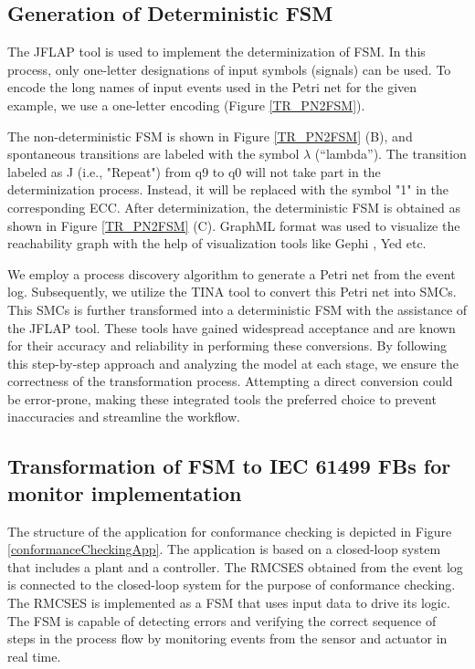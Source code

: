 \documentclass{ieeeojies}
\begin{document}
\subsection{Generation of Deterministic FSM }



The JFLAP tool \cite{rodger2015jflap} is used to implement the determinization of FSM. In this process, only one-letter designations of input symbols (signals) can be used. To encode the long names of input events used in the Petri net for the given example, we use a one-letter encoding (Figure \ref{TR_PN2FSM}).


The non-deterministic FSM  is shown in Figure \ref{TR_PN2FSM} (B), and spontaneous transitions are labeled with the symbol $\lambda$ (“lambda”). The transition labeled as J (i.e., "Repeat") from q9 to q0 will not take part in the determinization process. Instead, it will be replaced with the symbol "1" in the corresponding ECC. After determinization, the deterministic FSM is obtained as shown in Figure \ref{TR_PN2FSM} (C). GraphML format \cite{GraphMLSpec} was used to visualize the reachability graph with the  help of visualization tools like Gephi \cite{bastian2009gephi}, Yed \cite{yworks} etc. 

We employ a process discovery algorithm to generate a Petri net from the event log. Subsequently, we utilize the TINA tool to convert this Petri net into SMCs. This SMCs is further transformed into a deterministic FSM with the assistance of the JFLAP tool. These tools have gained widespread acceptance and are known for their accuracy and reliability in performing these conversions. By following this step-by-step approach and analyzing the model at each stage, we ensure the correctness of the transformation process. Attempting a direct conversion could be error-prone, making these integrated tools the preferred choice to prevent inaccuracies and streamline the workflow.




\subsection{Transformation of FSM to IEC 61499 FBs for monitor implementation}


The structure of the application for conformance checking is depicted in Figure \ref{conformanceCheckingApp}. The application is based on a closed-loop system that includes a plant and a controller. The RMCSES obtained from the event log is connected to the closed-loop system for the purpose of conformance checking. The RMCSES is implemented as a FSM that uses input data to drive its logic. The FSM is capable of detecting errors and verifying the correct sequence of steps in the process flow by monitoring events from the sensor and actuator in real time.
\end{document}
